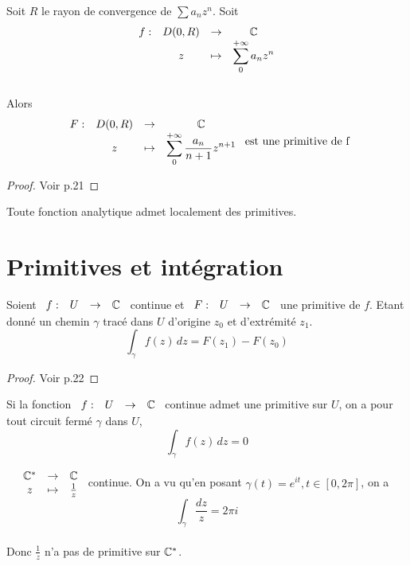 \documentclass[]{report}
\begin{document}
\begin{prop}{}{}
    Soit $R$ le rayon de convergence de $\sum a_nz^n$. Soit $$\begin{array}{ccccc}
f : & D(0,R) & \to & \mathbb{C} \\
  & z & \mapsto &  \displaystyle{\sum_0^{+\infty}a_nz^n} \end{array}$$\\
Alors $$\begin{array}{ccccc}
F : & D(0,R) & \to & \mathbb{C} \\
  & z & \mapsto & \displaystyle{\sum_0^{+\infty}\frac{a_n}{n+1}z^{n+1}}
\end{array}\text{ est une primitive de f}$$
\end{prop}

\begin{proof}{}{}
    Voir p.21
\end{proof}

\begin{cor}{}{}
    Toute fonction analytique admet localement des primitives.
\end{cor}

\section*{Primitives et intégration}

\begin{prop}{}{}
    Soient $\begin{array}{ccccc}
f : & U & \to & \mathbb{C}
\end{array}$ continue et $\begin{array}{ccccc}
F : & U & \to & \mathbb{C}
\end{array}$ une primitive de $f$. Etant donné un chemin $\gamma$ tracé dans $U$ d'origine $z_0$ et d'extrémité $z_1$.$$\int_\gamma f(z)\,dz=F(z_1)-F(z_0)$$
\end{prop}

\begin{proof}{}{}
    Voir p.22
\end{proof}

\begin{cor}{}{}
    Si la fonction $\begin{array}{ccccc}
f : & U & \to & \mathbb{C}
\end{array}$ continue admet une primitive sur $U$, on a pour tout circuit fermé $\gamma$ dans $U$, $$\int_\gamma f(z)\,dz=0$$
\end{cor}

\begin{ex}{}{}
    $\begin{array}{ccccc}
& \mathbb{C}^* & \to & \mathbb{C} \\
& z & \mapsto & \frac{1}{z}
\end{array}$ continue. On a vu qu'en posant $\gamma(t)=e^{it},t\in[0,2\pi]$, on a $$\int_\gamma\frac{dz}{z}=2\pi i$$\\
Donc $\frac{1}{z}$ n'a pas de primitive sur $\mathbb{C}^*$.
\end{ex}
\end{document}
